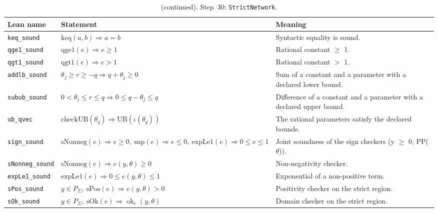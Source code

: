 \addtocounter{table}{-1}
{\small
\begin{longtable}{@{}>{\raggedright\arraybackslash}p{3.6cm}>{\raggedright\arraybackslash}p{6.6cm}>{\raggedright\arraybackslash}p{5.6cm}@{}}
\caption[]{(continued). Step~30: \texttt{StrictNetwork}.}\\
\toprule
Lean name & Statement & Meaning \\
\midrule
\endhead
\texttt{keq\_\allowbreak{}sound} & $\displaystyle \mathrm{keq}(a,b)\Rightarrow a=b$ & Syntactic equality is sound. \\[3pt]
\texttt{qge1\_\allowbreak{}sound} & $\displaystyle \mathrm{qge1}(e)\Rightarrow e\ge1$ & Rational constant $\ge$ 1. \\[3pt]
\texttt{qgt1\_\allowbreak{}sound} & $\displaystyle \mathrm{qgt1}(e)\Rightarrow e>1$ & Rational constant $>$ 1. \\[3pt]
\texttt{addlb\_\allowbreak{}sound} & $\displaystyle \theta_j\ge r\ge-q\Rightarrow q+\theta_j\ge0$ & Sum of a constant and a parameter with a declared lower bound. \\[3pt]
\texttt{subub\_\allowbreak{}sound} & $\displaystyle 0<\theta_j\le r\le q\Rightarrow0\le q-\theta_j\le q$ & Difference of a constant and a parameter with a declared upper bound. \\[3pt]
\texttt{ub\_\allowbreak{}qvec} & $\displaystyle \mathrm{checkUB}(\theta_q)\Rightarrow\mathrm{UB}(\iota(\theta_q))$ & The rational parameters satisfy the declared bounds. \\[3pt]
\texttt{sign\_\allowbreak{}sound} & $\displaystyle \mathrm{sNonneg}(e)\Rightarrow e\ge0,\ \mathrm{snp}(e)\Rightarrow e\le0,\ \mathrm{expLe1}(e)\Rightarrow0\le e\le1$ & Joint soundness of the sign checkers (y $\ge$ 0, PP($\theta$)). \\[3pt]
\texttt{sNonneg\_\allowbreak{}sound} & $\displaystyle \mathrm{sNonneg}(e)\Rightarrow e(y,\theta)\ge0$ & Non-negativity checker. \\[3pt]
\texttt{expLe1\_\allowbreak{}sound} & $\displaystyle \mathrm{expLe1}(e)\Rightarrow0\le e(y,\theta)\le1$ & Exponential of a non-positive term. \\[3pt]
\texttt{sPos\_\allowbreak{}sound} & $\displaystyle y\in P_\Sigma,\ \mathrm{sPos}(e)\Rightarrow e(y,\theta)>0$ & Positivity checker on the strict region. \\[3pt]
\texttt{sOk\_\allowbreak{}sound} & $\displaystyle y\in P_\Sigma,\ \mathrm{sOk}(e)\Rightarrow\operatorname{ok}_e(y,\theta)$ & Domain checker on the strict region. \\[3pt]

\end{longtable}}
